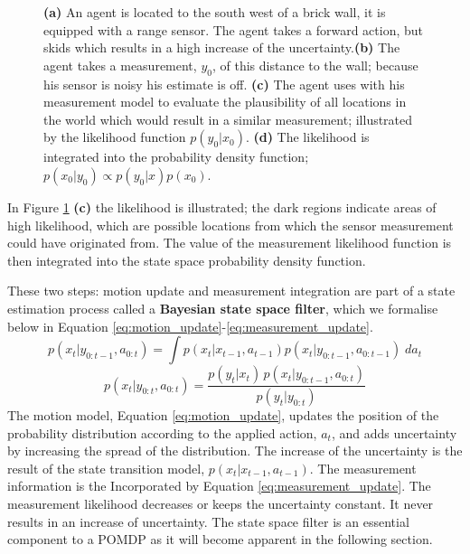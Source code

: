 \begin{figure}[h]
  \centering
 \caption{\textbf{(a)} An agent is located to the south west of a brick wall, it is equipped with a 
  range sensor. The agent takes a forward action, but skids which results in a high increase of the uncertainty.\textbf{(b)} 
  The agent takes a measurement, $y_0$, of this distance to the wall; because his sensor is noisy his estimate is off. 
  \textbf{(c)} The agent uses with his measurement model to evaluate the plausibility of all locations in the world which would result in a similar
  measurement; illustrated by the likelihood function $p(y_0|x_0)$. \textbf{(d)} The likelihood is integrated into the probability 
  density function; $p(x_0|y_0) \propto p(y_0|x)p(x_0)$.}
  \label{fig:belief_update_example}
\end{figure}

In Figure \ref{fig:belief_update_example} \textbf{(c)} the likelihood is illustrated; the dark regions indicate areas of high 
likelihood, which are possible locations from which the sensor measurement could have originated from. The value of the measurement
likelihood function is then integrated into the state space probability density function.

These two steps: motion update and measurement integration are part of a state estimation process called a \textbf{Bayesian state space filter}, 
which we formalise below in Equation \ref{eq:motion_update}-\ref{eq:measurement_update}.
\begin{equation}\label{eq:motion_update}
 p(x_t|y_{0:t-1},a_{0:t}) = \int p(x_t|x_{t-1},a_{t-1}) p(x_t|y_{0:t-1},a_{0:t-1})\;da_t
\end{equation}
\begin{equation}\label{eq:measurement_update}
 p(x_t|y_{0:t},a_{0:t}) = \frac{p(y_t|x_t)\,p(x_t|y_{0:t-1},a_{0:t})}{p(y_t|y_{0:t})}
\end{equation}
The motion model, Equation \ref{eq:motion_update}, updates the position of the probability distribution according to 
the applied action, $a_t$, and adds uncertainty by increasing the spread of the distribution. The increase of the 
uncertainty is the result of the state transition model, $p(x_t|x_{t-1},a_{t-1})$. The measurement information is 
the Incorporated by Equation \ref{eq:measurement_update}. The measurement likelihood decreases or keeps the uncertainty 
constant. It never results in an increase of uncertainty. The state space filter is an essential component to a POMDP
as it will become apparent in the following section.

